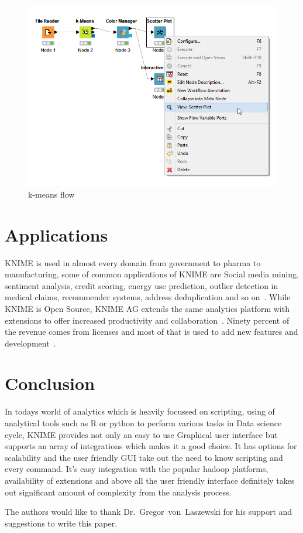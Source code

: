 \begin{figure}[!ht]
	\centering\includegraphics[width=\columnwidth]{../images/kmeans_flow.png}
	\caption{k-means flow~\cite{hid-sp18-517-wf}}
 	\label{fig:kmean}
\end{figure}


\section{Applications}

KNIME is used in almost every domain from government to pharma to
manufacturing, some of common applications of KNIME are Social media
mining, sentiment analysis, credit scoring, energy use prediction,
outlier detection in medical claims, recommender systems, address
deduplication and so on~\cite{hid-sp18-517-applications}.  While KNIME
is Open Source, KNIME AG extends the same analytics platform with
extensions to offer increased productivity and
collaboration~\cite{hid-sp18-517-opensource}.  Ninety percent of the
revenue comes from licenses and most of that is used to add new
features and development~\cite{hid-sp18-517-opensource}.

\section{Conclusion}

In todays world of analytics which is heavily focussed on scripting,
using of analytical tools such as R or python to perform various tasks
in Data science cycle, KNIME provides not only an easy to use
Graphical user interface but supports an array of integrations which
makes it a good choice. It has options for scalability and the user
friendly GUI take out the need to know scripting and every
command. It's easy integration with the popular hadoop platforms,
availability of extensions and above all the user friendly interface
definitely takes out significant amount of complexity from the
analysis process.

\begin{acks}

  The authors would like to thank Dr.~Gregor~von~Laszewski for his
  support and suggestions to write this paper.

\end{acks}


 

